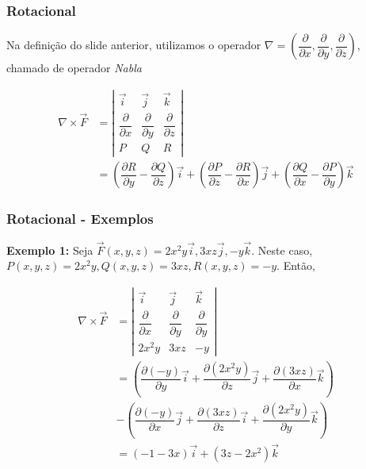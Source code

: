 \begin{frame}
    \frametitle{Rotacional}
    \justifying
    Na definição do slide anterior, utilizamos o operador $\nabla = \left(
        \dfrac{\partial}{\partial x},
        \dfrac{\partial}{\partial y},
        \dfrac{\partial}{\partial z}
        \right)$, chamado de operador \textit{Nabla}
    
    \begin{align*}
        \nabla \times \vec{F} & = \left|\begin{array}{ccc}
            \vec{i}                      & \vec{j}                      & \vec{k}                      \\[2mm]
            \dfrac{\partial}{\partial x} & \dfrac{\partial}{\partial y} & \dfrac{\partial}{\partial z} \\[4mm]
            P                            & Q                            & R
        \end{array}\right| \\[3mm]
                              & = \left(
        \dfrac{\partial R}{\partial y}-\dfrac{\partial Q}{\partial z}
        \right)\vec{i} + \left(
        \dfrac{\partial P}{\partial z}-\dfrac{\partial R}{\partial x}
        \right)\vec{j} + \left(
        \dfrac{\partial Q}{\partial x}-\dfrac{\partial P}{\partial y}
        \right)\vec{k}
    \end{align*}
    
\end{frame}

\begin{frame}
    \frametitle{Rotacional - Exemplos}
    \justifying
    \textbf{Exemplo 1:} Seja $\vec{F}(x, y, z)=2x^2y\vec{i}, 3xz\vec{j}, -y\vec{k}$. Neste caso, $P(x, y ,z)=2x^2y, Q(x, y, z)=3xz, R(x, y, z)=-y$. Então,
    
    \begin{align*}
        \nabla \times \vec{F} & = \left|\begin{array}{ccc}
            \vec{i}                      & \vec{j}                      & \vec{k}                      \\[2mm]
            \dfrac{\partial}{\partial x} & \dfrac{\partial}{\partial y} & \dfrac{\partial}{\partial y} \\[4mm]
            2x^2y                        & 3xz                          & -y
        \end{array}\right| \\[3mm]
                              & = \left(
        \dfrac{\partial (-y)}{\partial y}
        \vec{i} +
        \dfrac{\partial (2x^2y)}{\partial z}
        \vec{j} +
        \dfrac{\partial (3xz)}{\partial x}
        \vec{k}
        \right)
        \\[3mm]
                              & - \left(
        \dfrac{\partial(-y)}{\partial x}
        \vec{j} +
        \dfrac{\partial (3xz)}{\partial z}
        \vec{i} +
        \dfrac{\partial (2x^2y)}{\partial y}
        \vec{k}
        \right)
        \\[3mm]
                              & = (-1-3x)\vec{i} + (3z-2x^2)\vec{k}
    \end{align*}
\end{frame}

